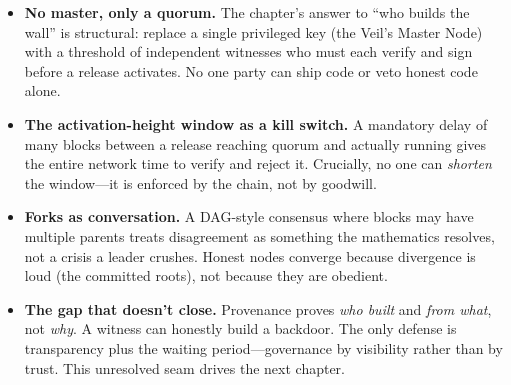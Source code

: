 \begin{itemize}
\tightlist
\item
  \textbf{No master, only a quorum.} The chapter's answer to ``who builds the
  wall'' is structural: replace a single privileged key (the Veil's Master
  Node) with a threshold of independent witnesses who must each verify and sign
  before a release activates. No one party can ship code or veto honest code
  alone.
\item
  \textbf{The activation-height window as a kill switch.} A mandatory delay of
  many blocks between a release reaching quorum and actually running gives the
  entire network time to verify and reject it. Crucially, no one can
  \emph{shorten} the window---it is enforced by the chain, not by goodwill.
\item
  \textbf{Forks as conversation.} A DAG-style consensus where blocks may have
  multiple parents treats disagreement as something the mathematics resolves,
  not a crisis a leader crushes. Honest nodes converge because divergence is
  loud (the committed roots), not because they are obedient.
\item
  \textbf{The gap that doesn't close.} Provenance proves \emph{who built} and
  \emph{from what}, not \emph{why}. A witness can honestly build a backdoor.
  The only defense is transparency plus the waiting period---governance by
  visibility rather than by trust. This unresolved seam drives the next
  chapter.
\end{itemize}

